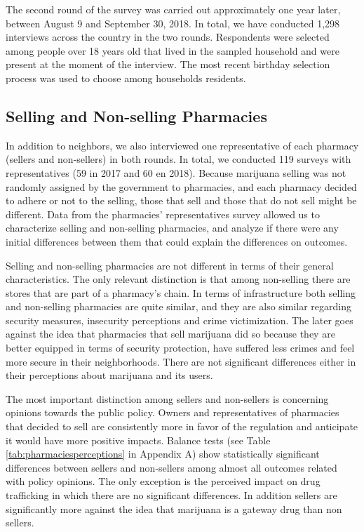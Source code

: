 \documentclass[11pt]{article}
\begin{document}
The second round of the survey was carried out approximately one year later, between August 9 and September 30, 2018. In total, we have conducted 1,298 interviews across the country in the two rounds. Respondents were selected among people over 18 years old that lived in the sampled household and were present at the moment of the interview. The most recent birthday selection process was used to choose among households residents.

\subsection{Selling and Non-selling Pharmacies}
In addition to neighbors, we also interviewed one representative of each pharmacy (sellers and non-sellers) in both rounds. In total, we conducted 119 surveys with representatives (59 in 2017 and 60 en 2018). Because marijuana selling was not randomly assigned by the government to pharmacies, and each pharmacy decided to adhere or not to the selling, those that sell and those that do not sell might be different. Data from the pharmacies' representatives survey allowed us to characterize selling and non-selling pharmacies, and analyze if there were any initial differences between them that could explain the differences on outcomes.

Selling and non-selling pharmacies are not different in terms of their general characteristics. The only relevant distinction is that among non-selling there are stores that are part of a pharmacy's chain. In terms of infrastructure both selling and non-selling pharmacies are quite similar, and they are also similar regarding security measures, insecurity perceptions and crime victimization. The later goes against the idea that pharmacies that sell marijuana did so because they are better equipped in terms of security protection, have suffered less crimes and feel more secure in their neighborhoods. There are not significant differences either in their perceptions about marijuana and its users.

The most important distinction among sellers and non-sellers is concerning opinions towards the public policy. Owners and representatives of pharmacies that decided to sell are consistently more in favor of the regulation and anticipate it would have more positive impacts. Balance tests (see Table \ref{tab:pharmaciesperceptions} in Appendix A) show statistically significant differences between sellers and non-sellers among almost all outcomes related with policy opinions. The only exception is the perceived impact on drug trafficking in which there are no significant differences. In addition sellers are significantly more against the idea that marijuana is a gateway drug than non sellers.
\end{document}
